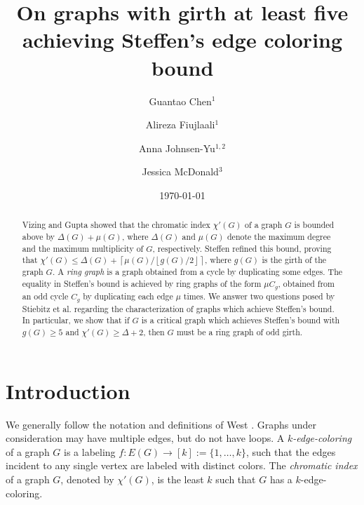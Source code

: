 \documentclass[12pt,oneside]{amsart}
\begin{document}
    \author{Guantao Chen$^1$}
    \author{Alireza Fiujlaali$^1$}
    \author{Anna Johnsen-Yu$^{1,2}$}
    \author{Jessica McDonald$^3$}
    \address{$^1$Department of Mathematics and Statistics, Georgia State University, Atlanta, GA USA 30303-2918. Supported in part  NSF grant DMS-2154331.}
\address{$^{2}$Department of Mathematics,  Vanderbilt University, Nashville, TN 37240-0001 }
    \address{$^3$Department of Mathematics and Statistics,  Auburn University, Auburn, AL 36849. Supported in part by Simons Foundation Grant \#845698 and NSF grant DMS-2452103.}



\title[]{On graphs with girth at least five achieving Steffen's edge coloring bound}


\begin{abstract}
Vizing and Gupta showed that the chromatic index $\chi'(G)$ of a graph $G$ is bounded above by $\Delta(G) + \mu(G)$, where $\Delta(G)$ and $\mu(G)$ denote the maximum degree and the maximum multiplicity of $G$, respectively. Steffen refined this bound, proving that $\chi'(G) \leq \Delta(G) + \left\lceil \mu(G)/\left\lfloor g(G)/2 \right\rfloor \right\rceil$, where $g(G)$ is the girth of the graph $G$. A {\it ring graph} is a graph obtained from a cycle by duplicating some edges. The equality in Steffen's bound is achieved by ring graphs of the form $\mu C_g$, obtained from an odd cycle $C_g$ by duplicating each edge $\mu$ times. We answer two questions posed by Stiebitz et al. regarding the characterization of graphs which achieve Steffen's bound. In particular, we show that if $G$ is a critical graph which achieves Steffen's bound with $g(G)\geq 5$ and $\chi'(G)\geq \Delta+2$, then $G$ must be a ring graph of odd girth.
\end{abstract}


   \date{\today}

   \maketitle
\section{Introduction}

We generally follow the notation and definitions of West \cite{MR1367739}.  Graphs under consideration may have multiple edges, but do not have loops.
A {\it $k$-edge-coloring} of a graph $G$ is a labeling $f: E(G)\to [k]:=\{1, \dots, k\}$, such that the edges incident to any single vertex are labeled with distinct colors. The {\it chromatic index} of a graph $G$, denoted by $\chi'(G)$, is the least $k$ such that $G$ has a $k$-edge-coloring.
\end{document}
